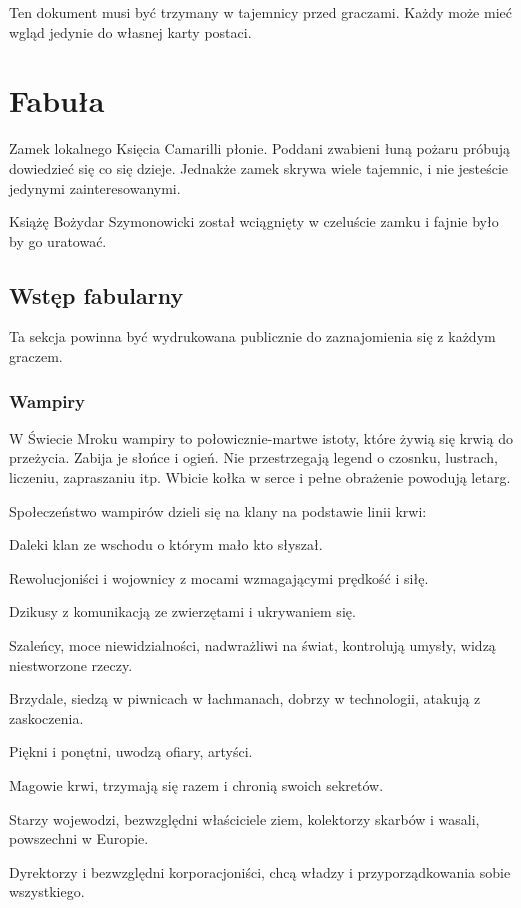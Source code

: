 Ten dokument musi być trzymany w tajemnicy przed graczami.
Każdy może mieć wgląd jedynie do własnej karty postaci.

\section{Fabuła}
	Zamek lokalnego Księcia Camarilli płonie.
	Poddani zwabieni łuną pożaru próbują dowiedzieć się co się dzieje.
	Jednakże zamek skrywa wiele tajemnic, i nie jesteście jedynymi zainteresowanymi.
	
	Książę Bożydar Szymonowicki został wciągnięty w czeluście zamku i fajnie było by go uratować.
	
	\subsection{Wstęp fabularny}
	\label{sec:fabularny}
		Ta sekcja powinna być wydrukowana publicznie do zaznajomienia się z każdym graczem.
		\subsubsection{Wampiry}
			W Świecie Mroku wampiry to połowicznie-martwe istoty, które żywią się krwią do przeżycia.
			Zabija je słońce i ogień. Nie przestrzegają legend o czosnku, lustrach, liczeniu, zapraszaniu itp.
			Wbicie kołka w serce i pełne obrażenie powodują letarg.
			
			Społeczeństwo wampirów dzieli się na klany na podstawie linii krwi:
			\begin{description}[noitemsep]
				\item[Banu Haquim] Daleki klan ze wschodu o którym mało kto słyszał.
				\item[Brujah] Rewolucjoniści i wojownicy z mocami wzmagającymi prędkość i siłę.
				\item[Gangriel] Dzikusy z komunikacją ze zwierzętami i ukrywaniem się.
				\item[Malkawian] Szaleńcy, moce niewidzialności, nadwrażliwi na świat, kontrolują umysły, widzą niestworzone rzeczy.
				\item[Nosferatu] Brzydale, siedzą w piwnicach w łachmanach, dobrzy w technologii, atakują z zaskoczenia.
				\item[Toreador] Piękni i ponętni, uwodzą ofiary, artyści.
				\item[Tremere] Magowie krwi, trzymają się razem i chronią swoich sekretów.
				\item[Tzimisce] Starzy wojewodzi, bezwzględni właściciele ziem, kolektorzy skarbów i wasali, powszechni w Europie.
				\item[Ventrue] Dyrektorzy i bezwzględni korporacjoniści, chcą władzy i przyporządkowania sobie wszystkiego.
			\end{description}
			
